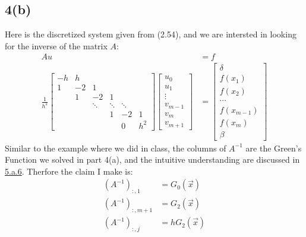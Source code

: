 \documentclass[]{article}
\begin{document}
    \subsection*{4(b)}
        Here is the discretized system given from (2.54), and we are intersted in looking for the inverse of the matrix $A$: 
        \begin{align*}\tag{4.b.1}\label{eqn:4.b.1}
            Au &= f 
            \\
            \frac{1}{h^2} \begin{bmatrix}
                -h & h  & & & &\\
                1 & -2 & 1 & & & \\
                & 1 & -2 & 1 & &  \\[0.2em] 
                & & \ddots & \ddots & \ddots & \\
                & & & 1& -2&1\\
                & & & & 0 & h^2 
            \end{bmatrix}
            \begin{bmatrix}
                u_0 \\ u_1 \\ \vdots \\ v_{m - 1} \\ v_{m} \\ v_{m + 1}
            \end{bmatrix} &= 
            \begin{bmatrix}
                \delta \\f(x_1) \\f(x_2)\\\cdots \\f(x_{m - 1}) \\f(x_m)
                \\ 
                \beta
            \end{bmatrix}
        \end{align*}
        Similar to the example where we did in class, the columns of $A^{-1}$ are the Green's Function we solved in part 4(a), and the intuitive understanding are discussed in \hyperref[eqn:5.a.6]{5.a.6}. Therfore the claim I make is: 
        \begin{align*}\tag{4.b.2}\label{eqn:4.b.2}
            (A^{-1})_{:, 1} &= G_0(\vec{x}) 
            \\
            (A^{-1})_{:, m + 1} &= G_2(\vec{x}) 
            \\
            (A^{-1})_{:, j} &= hG_2(\vec{x}) 
        \end{align*}
\end{document}
